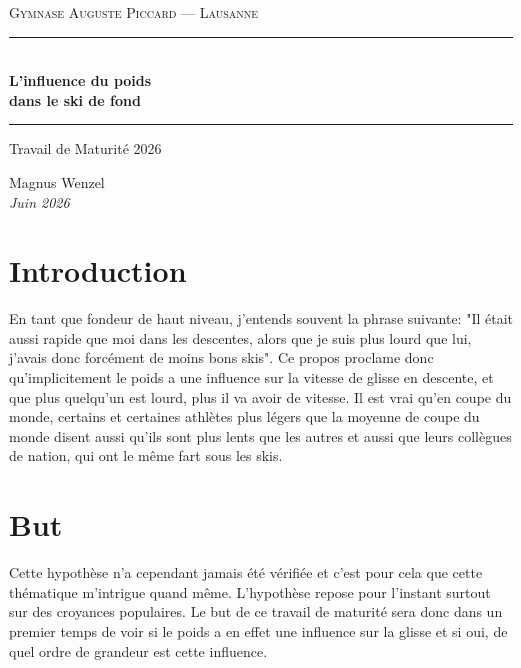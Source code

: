 \documentclass{article}
\begin{document}
\begin{titlepage}
    \centering
    \vspace*{2cm}

    {\large\textsc{Gymnase Auguste Piccard --- Lausanne}}

    \vspace{3.5cm}

    \rule{\textwidth}{1.5pt}\\[0.6cm]
    {\Huge\bfseries L'influence du poids\\[0.5cm]dans le ski de fond}\\[0.6cm]
    \rule{\textwidth}{1.5pt}

    \vspace{2cm}

    {\LARGE Travail de Maturité 2026}

    \vfill

    {\large Magnus Wenzel}\\[0.4cm]
    {\normalsize\textit{Juin 2026}}

    \vspace{2cm}
\end{titlepage}

\section{Introduction}

En tant que fondeur de haut niveau, j'entends souvent la phrase suivante: "Il était aussi rapide que moi dans les descentes, alors que je suis plus lourd que lui, j'avais donc forcément de moins bons skis". Ce propos proclame donc qu'implicitement le poids a une influence sur la vitesse de glisse en descente, et que plus quelqu'un est lourd, plus il va avoir de vitesse.
\newline Il est vrai qu'en coupe du monde, certains et certaines athlètes plus légers que la moyenne de coupe du monde disent aussi qu'ils sont plus lents que les autres et aussi que leurs collègues de nation, qui ont le même fart sous les skis.

\section{But}

Cette hypothèse n'a cependant jamais été vérifiée et c'est pour cela que cette thématique m'intrigue quand même. L'hypothèse repose pour l'instant surtout sur des croyances populaires. 
\newline Le but de ce travail de maturité sera donc dans un premier temps de voir si le poids a en effet une influence sur la glisse et si oui, de quel ordre de grandeur est cette influence.  
\end{document}
